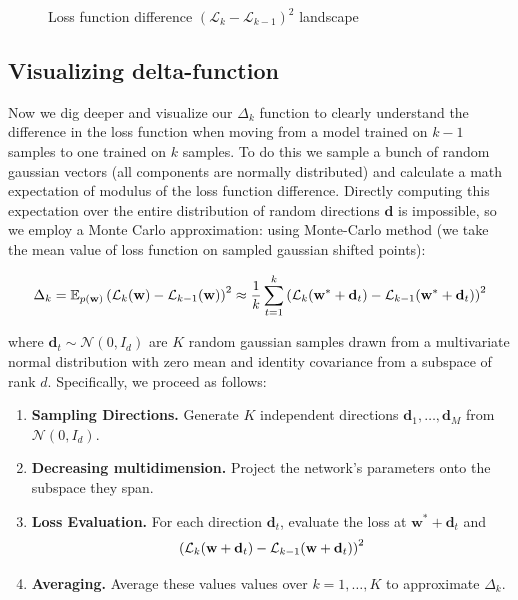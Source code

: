 \documentclass{article}
\begin{document}
\begin{figure}[!htbp]
  \hspace*{-11.5cm}
  \caption{Loss function difference $(\mathcal{L}_{k} - \mathcal{L}_{k-1})^2$ landscape}
  \label{fig:base_loss_diff}
\end{figure}

\subsection{Visualizing delta-function}

Now we dig deeper and visualize our $\Delta_k$ function to clearly understand the difference in the loss function when
moving from a model trained on $k-1$ samples to one trained on $k$ samples. To do this we sample a bunch of random gaussian
vectors (all components are normally distributed) and calculate a
math expectation of modulus of the loss function difference.
Directly computing this expectation over the entire distribution of random directions $\mathbf{d}$
is impossible, so we employ a Monte Carlo approximation: using Monte-Carlo method (we take the mean value of loss function
on sampled gaussian shifted points):

$$\Delta_k = \mathbb{E}_{p(\mathbf{w})} \left( \mathcal{L}_{k}(\mathbf{w}) - \mathcal{L}_{k-1}(\mathbf{w}) \right)^2 \approx
  \frac{1}{k} \sum_{t=1}^{k} \left( \mathcal{L}_k(\mathbf{w}^* + \mathbf{d}_t) - \mathcal{L}_{k-1}(\mathbf{w}^* + \mathbf{d}_t) \right)^2$$

where $\mathbf{d}_t \sim \mathcal{N}(0,I_d)$ are $K$ random gaussian samples drawn from a multivariate normal distribution
with zero mean and identity covariance from a subspace of rank $d$. Specifically, we proceed as follows:

\begin{enumerate}
  \item \textbf{Sampling Directions.} Generate $K$ independent directions $\mathbf{d}_1, \dots, \mathbf{d}_M$
        from $\mathcal{N}(0,I_d)$.
  \item \textbf{Decreasing multidimension.} Project the network’s parameters onto the subspace they span.
  \item \textbf{Loss Evaluation.} For each direction $\mathbf{d}_t$, evaluate the loss at
        $\mathbf{w}^* + \mathbf{d}_t$ and
        $$\left( \mathcal{L}_{k}(\mathbf{w} + \mathbf{d}_t) - \mathcal{L}_{k-1}(\mathbf{w} + \mathbf{d}_t) \right)^2 $$
  \item \textbf{Averaging.} Average these values values over $k = 1, \dots, K$ to approximate $\Delta_k$.
\end{enumerate}
\end{document}
